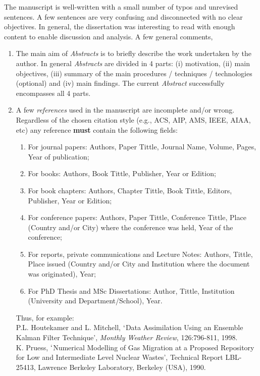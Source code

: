 \documentclass[14pt,twoside]{report}
\begin{document}
The manuscript is well-written with a small number of typos and unrevised sentences. A few sentences are very confusing and disconnected with no clear objectives. In general, the dissertation was interesting to read with enough content to enable discussion and analysis. A few general comments,
\begin{enumerate}
\item The main aim of {\it Abstracts} is to briefly describe the work undertaken by the author. In general {\it Abstracts} are divided in 4 parts: (i) motivation, (ii) main objectives, (iii) summary of the main procedures / techniques / technologies (optional) and (iv) main findings. The current {\it Abstract} successfully encompasses all 4 parts.
%
\item A few {\it references} used in the manuscript are incomplete and/or wrong. Regardless of the chosen citation style (e.g., ACS, AIP, AMS, IEEE, AIAA, etc) any reference {\bf must} contain the following fields: 
\begin{enumerate}
\item For journal papers: Authors, Paper Tittle, Journal Name, Volume, Pages, Year of publication;
\item For books: Authors, Book Tittle, Publisher, Year or Edition;
\item For book chapters: Authors, Chapter Tittle, Book Tittle, Editors, Publisher, Year or Edition;
\item For conference papers: Authors, Paper Tittle, Conference Tittle, Place (Country and/or City) where the conference was held, Year of the conference;
\item For reports,  private communications and Lecture Notes: Authors, Tittle, Place issued (Country and/or City and Institution where the document was originated), Year;
\item For PhD Thesis and MSc Dissertations: Author, Tittle, Institution (University and Department/School), Year.
\end{enumerate}  
Thus, for example:\\
\noindent
[39] P.L. Houtekamer and L. Mitchell, $\lq$Data Assimilation Using an Ensemble Kalman Filter Technique', {\it Monthly Weather Review}, 126:796-811, 1998.\\
\noindent
[40] K. Pruess, $\lq$Numerical Modelling of Gas Migration at a Proposed Repository for Low and Intermediate Level Nuclear Wastes', Technical Report LBL-25413, Lawrence Berkeley Laboratory, Berkeley (USA), 1990.\\
\noindent

\end{enumerate}
\end{document}
